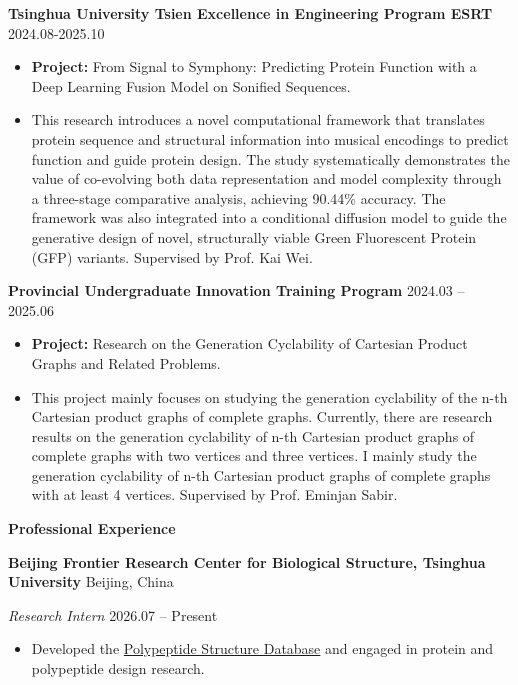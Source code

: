 \documentclass[11pt]{article}
\begin{document}
	\textbf{Tsinghua University Tsien Excellence in Engineering Program ESRT} \hfill 2024.08-2025.10
	\begin{itemize}[noitemsep, topsep=0pt, partopsep=0pt, parsep=0pt, leftmargin=*]
		\item \textbf{Project:} From Signal to Symphony: Predicting Protein Function with a Deep Learning Fusion Model on Sonified Sequences.
		\item This research introduces a novel computational framework that translates protein sequence and structural information into musical encodings to predict function and guide protein design. The study systematically demonstrates the value of co-evolving both data representation and model complexity through a three-stage comparative analysis, achieving 90.44\% accuracy. The framework was also integrated into a conditional diffusion model to guide the generative design of novel, structurally viable Green Fluorescent Protein (GFP) variants. Supervised by Prof. Kai Wei.
	\end{itemize}
	
	\vspace{10pt}
	
	\textbf{Provincial Undergraduate Innovation Training Program} \hfill 2024.03 – 2025.06
	\begin{itemize}[noitemsep, topsep=0pt, partopsep=0pt, parsep=0pt, leftmargin=*]
		\item \textbf{Project:} Research on the Generation Cyclability of Cartesian Product Graphs and Related Problems.
		\item This project mainly focuses on studying the generation cyclability of the n-th Cartesian product graphs of complete graphs. Currently, there are research results on the generation cyclability of n-th Cartesian product graphs of complete graphs with two vertices and three vertices. I mainly study the generation cyclability of n-th Cartesian product graphs of complete graphs with at least 4 vertices. Supervised by Prof. Eminjan Sabir.
	\end{itemize}
	
	\vspace{12pt}
	
	\clearpage
	\begin{center}
		\textbf{\large Professional Experience}
	\end{center}
	\textbf{Beijing Frontier Research Center for Biological Structure, Tsinghua University} \hfill Beijing, China
	
	\textit{Research Intern} \hfill 2026.07 – Present
	\begin{itemize}[noitemsep, topsep=0pt, partopsep=0pt, parsep=0pt, leftmargin=*]
		\item Developed the \href{https://polypeptide.wyqmath.cn/}{Polypeptide Structure Database} and engaged in protein and polypeptide design research.
	\end{itemize}
	
\end{document}
